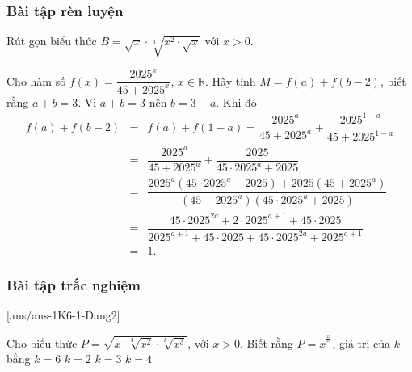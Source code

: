 \subsubsection{Bài tập rèn luyện}
\centerline{}
\begin{bt}%
	Rút gọn biểu thức $B=\sqrt{x}\cdot \sqrt[3]{x^2\cdot \sqrt{x}}$ với $x>0$.
\end{bt}

\begin{bt}%
	Cho hàm số $f(x)=\dfrac{2025^x}{45+2025^x}$, $x\in \mathbb{R}$. Hãy tính $M=f(a)+f(b-2)$, biết rằng $a+b=3$.
	\loigiai
	{Vì $a+b=3$ nên $b=3-a$. Khi đó
		\allowdisplaybreaks
		\begin{eqnarray*}
			f(a)+f(b-2) &=& f(a)+f(1-a)= \dfrac{2025^a}{45+2025^a}+\dfrac{2025^{1-a}}{45+2025^{1-a}}\\
			&=& \dfrac{2025^a}{45+2025^a}+\dfrac{2025}{45\cdot 2025^a+2025}\\
			&=& \dfrac{2025^a\left(45\cdot 2025^a+2025\right) + 2025\left(45+2025^a\right)}{\left(45+2025^a\right)\left(45\cdot 2025^a+2025\right)}\\
			&=& \dfrac{45\cdot 2025^{2a}+2\cdot 2025^{a+1}+45\cdot 2025}{2025^{a+1}+45\cdot 2025+45\cdot 2025^{2a}+2025^{a+1}}\\
			&=& 1.
		\end{eqnarray*}
	}
\end{bt}
\subsubsection{Bài tập trắc nghiệm}
[ans/ans-1K6-1-Dang2]

\begin{ex}%
	Cho biểu thức $P=\sqrt{x\cdot \sqrt[3]{x^2}\cdot \sqrt[k]{x^3}}$, với $x>0$. Biết rằng $P=x^{^{\tfrac{23}{24}}}$, giá trị của $k$ bằng
	\choice
	{$k=6$}
	{$k=2$}
	{$k=3$}
	{\True $k=4$}
\end{ex}

